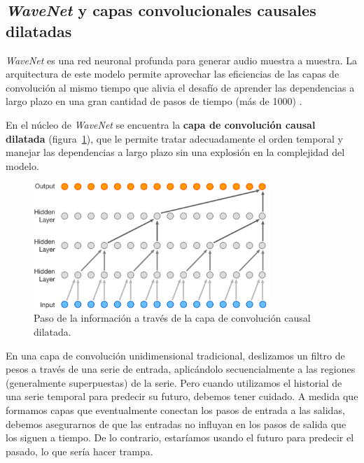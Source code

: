 \documentclass[a4paper,12pt]{article}
\begin{document}
\subsection{\textit{WaveNet} y capas convolucionales causales dilatadas}

\textit{WaveNet} es una red neuronal profunda para generar audio muestra a muestra. La arquitectura de este modelo permite aprovechar las eficiencias de las capas de convolución al mismo tiempo que alivia el desafío de aprender las dependencias a largo plazo en una gran cantidad de pasos de tiempo (más de 1000) \citep{wavenet2}.

En el núcleo de \textit{WaveNet} se encuentra la \textbf{capa de convolución causal dilatada} (figura~\ref{fig:causal-conv}), que le permite tratar adecuadamente el orden temporal y manejar las dependencias a largo plazo sin una explosión en la complejidad del modelo. \citep{wavenet}

\begin{figure}[H]
	\begin{center}				
		\includegraphics[width=0.8\textwidth]{causal-conv.png}
		\caption{Paso de la información a través de la capa de convolución causal dilatada. \citep{wavenet2}}
		\label{fig:causal-conv}
	\end{center}
\end{figure}

En una capa de convolución unidimensional tradicional, deslizamos un filtro de pesos a través de una serie de entrada, aplicándolo secuencialmente a las regiones (generalmente superpuestas) de la serie. Pero cuando utilizamos el historial de una serie temporal para predecir su futuro, debemos tener cuidado. A medida que formamos capas que eventualmente conectan los pasos de entrada a las salidas, debemos asegurarnos de que las entradas no influyan en los pasos de salida que los siguen a tiempo. De lo contrario, estaríamos usando el futuro para predecir el pasado, lo que sería hacer trampa.
\end{document}
